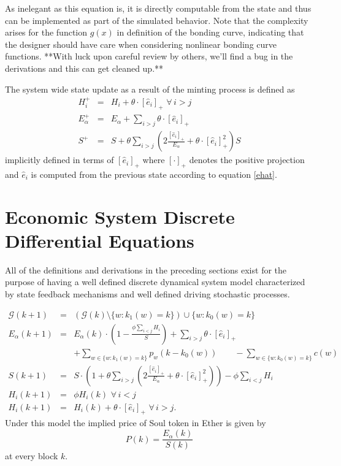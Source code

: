 \documentclass[11pt]{amsart}
\begin{document}
As inelegant as this equation is, it is directly computable from the state and thus can be implemented as part of the simulated behavior.  Note that the complexity arises for the function $g(x)$ in definition of the bonding curve, indicating that the designer should have care when considering nonlinear bonding curve functions. **With luck upon careful review by others, we'll find a bug in the derivations and this can get cleaned up.**

The system wide state update as a result of the minting process is defined as
\begin{eqnarray}
H_i^+ &=&  H_i + \theta\cdot [\hat e_i]_+ \,\,\forall \,i>j\\
E_\alpha^+ &=& E_\alpha + \sum_{i>j}  \theta\cdot [\hat e_i]_+\\
S^+ &=& S + \theta \sum_{i>j} \left(2\frac{[\hat e_i]_+}{E_\alpha}+\theta\cdot [\hat e_i]^2_+\right)S 
\end{eqnarray}
implicitly defined in terms of $[\hat e_i]_+$ where $[\cdot]_+$ denotes the positive projection and $\hat e_i$ is computed from the previous state according to equation \eqref{ehat}.
\section{Economic System Discrete Differential Equations}

All of the definitions and derivations in the preceding sections exist for the purpose of having a well defined discrete dynamical system model characterized by state feedback mechanisms and well defined driving stochastic processes.

\begin{eqnarray}
\mathcal{G}(k+1) &=& \left(\mathcal{G}(k) \setminus \{w: k_1(w)=k\}\right) \cup \{w : k_0(w) = k\} \\
E_\alpha(k+1) &=& E_\alpha(k) \cdot \left(1- \frac{\phi \sum_{i<j} H_i}{S}\right) + \sum_{i>j}  \theta\cdot [\hat e_i]_+\\
&&+\sum_{w\in\{w: k_1(w)=k\}} p_w\left(k-k_0(w)\right)  \qquad-\sum_{w\in\{w : k_0(w) = k\}} c(w)\\
S(k+1) &=& S \cdot \left(1+ \theta \sum_{i>j} \left(2\frac{[\hat e_i]_+}{E_\alpha}+\theta\cdot [\hat e_i]^2_+\right)\right)- \phi \sum_{i<j} H_i \\
H_i(k+1) &=& \phi H_i(k) \,\,\forall \,i<j\\
H_i(k+1) &=& H_i(k) + \theta\cdot [\hat e_i]_+ \,\,\forall \,i>j.
\end{eqnarray}
Under this model the implied price of Soul token in Ether is given by
\begin{equation}
P(k) = \frac{E_\alpha(k)}{S(k)}
\end{equation}
at every block $k$.
\end{document}
